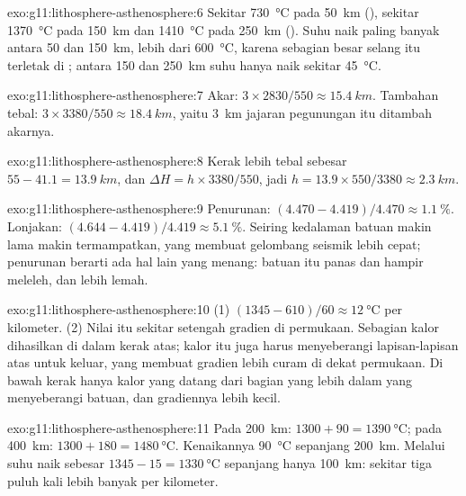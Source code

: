 \begin{solution}{exo:g11:lithosphere-asthenosphere:6}
Sekitar \qty{730}{\celsius} pada \qty{50}{km} (), sekitar
\qty{1370}{\celsius} pada \qty{150}{km} dan \qty{1410}{\celsius} pada
\qty{250}{km} (). Suhu naik paling banyak antara 50 dan
\qty{150}{km}, lebih dari \qty{600}{\celsius}, karena sebagian besar selang itu
terletak di ; antara 150 dan \qty{250}{km} suhu hanya naik sekitar
\qty{45}{\celsius}.
\end{solution}

\begin{solution}{exo:g11:lithosphere-asthenosphere:7}
Akar: $3 \times 2830/550 \approx \qty{15.4}{km}$. Tambahan tebal:
$3 \times 3380/550 \approx \qty{18.4}{km}$, yaitu \qty{3}{km} jajaran
pegunungan itu ditambah akarnya.
\end{solution}

\begin{solution}{exo:g11:lithosphere-asthenosphere:8}
Kerak lebih tebal sebesar $55 - 41.1 = \qty{13.9}{km}$, dan $\Delta H = h
\times 3380/550$, jadi $h = 13.9 \times 550/3380 \approx \qty{2.3}{km}$.
\end{solution}

\begin{solution}{exo:g11:lithosphere-asthenosphere:9}
Penurunan: $(4.470 - 4.419)/4.470 \approx \qty{1.1}{\percent}$. Lonjakan:
$(4.644 - 4.419)/4.419 \approx \qty{5.1}{\percent}$. Seiring kedalaman batuan
makin lama makin termampatkan, yang membuat gelombang seismik lebih cepat;
penurunan berarti ada hal lain yang menang: batuan itu panas dan hampir meleleh,
dan lebih lemah.
\end{solution}

\begin{solution}{exo:g11:lithosphere-asthenosphere:10}
(1) $(1345 - 610)/60 \approx \qty{12}{\celsius}$ per kilometer. (2) Nilai itu
sekitar setengah gradien di permukaan. Sebagian kalor dihasilkan di dalam kerak
atas; kalor itu juga harus menyeberangi lapisan-lapisan atas untuk keluar, yang
membuat gradien lebih curam di dekat permukaan. Di bawah kerak hanya kalor yang
datang dari bagian yang lebih dalam yang menyeberangi batuan, dan gradiennya
lebih kecil.
\end{solution}

\begin{solution}{exo:g11:lithosphere-asthenosphere:11}
Pada \qty{200}{km}: $1300 + 90 = \qty{1390}{\celsius}$; pada \qty{400}{km}:
$1300 + 180 = \qty{1480}{\celsius}$. Kenaikannya \qty{90}{\celsius} sepanjang
\qty{200}{km}. Melalui  suhu naik sebesar
$1345 - 15 = \qty{1330}{\celsius}$ sepanjang hanya \qty{100}{km}: sekitar tiga
puluh kali lebih banyak per kilometer.
\end{solution}

